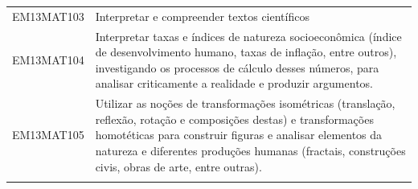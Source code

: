 \documentclass[12pt]{extarticle}
\begin{document}
\begin{longtable}{ll}
EM13MAT103 & Interpretar e compreender textos científicos                                                                                                                                                                                                                                                                                                                                                                                                                                                                                                                                                                                                                                                                                                                                                                          \\
\rowcolor[HTML]{E0F7FA} 
EM13MAT104 & Interpretar taxas e índices de natureza socioeconômica (índice de desenvolvimento humano, taxas de inflação, entre outros), investigando os processos de cálculo desses números, para analisar criticamente a realidade e produzir argumentos.                                                                                                                                                                                                                                                                                                                                                                                                                                                                                                                                                                        \\
\rowcolor[HTML]{FFF} 
EM13MAT105 & Utilizar as noções de transformações isométricas (translação, reflexão, rotação e composições destas) e transformações homotéticas para construir figuras e analisar elementos da natureza e diferentes produções humanas (fractais, construções civis, obras de arte, entre outras).                                                                                                                                                                                                                                                                                                                                                                                                                                                                                                                                 \\
\rowcolor[HTML]{E0F7FA} 

\end{longtable}
\end{document}
